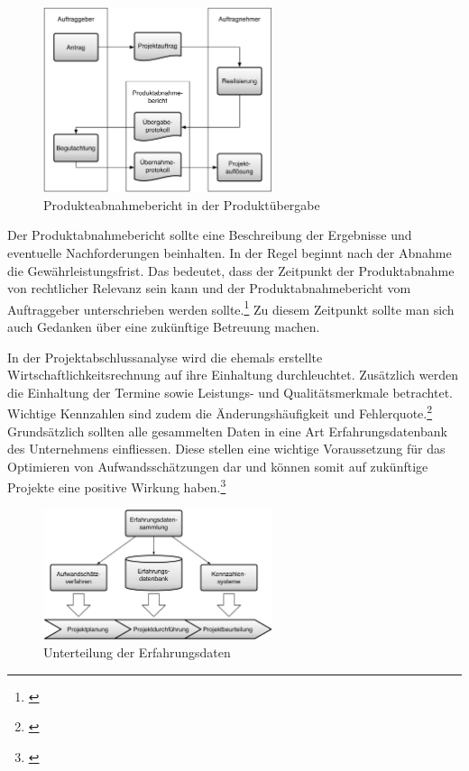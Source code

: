 \begin{figure}[htbp]
\begin{center}
\includegraphics[width=0.6\textwidth,angle=0]{./bilder/theorie/07_produkteuebergabe.pdf}
\caption{Produkteabnahmebericht in der Produktübergabe}
\label{pic:07_produkteuebergabe}
\end{center}
\end{figure}

Der Produktabnahmebericht sollte eine Beschreibung der Ergebnisse und eventuelle
Nachforderungen beinhalten. In der Regel beginnt nach der Abnahme die
Gewährleistungsfrist. Das bedeutet, dass der Zeitpunkt der Produktabnahme von
rechtlicher Relevanz sein kann und der Produktabnahmebericht vom Auftraggeber
unterschrieben werden sollte.\footnote{\citealp*[Vgl.][S. 86]{cronenbroeck2004handbuch}}
Zu diesem Zeitpunkt sollte man sich auch Gedanken über eine zukünftige Betreuung
machen.

In der Projektabschlussanalyse wird die ehemals erstellte Wirtschaftlichkeitsrechnung
auf ihre Einhaltung durchleuchtet. Zusätzlich werden die Einhaltung der Termine sowie
Leistungs- und Qualitätsmerkmale betrachtet. Wichtige Kennzahlen sind zudem
die Änderungshäufigkeit und Fehlerquote.\footnote{\citealp*[Vgl.][S. 265]{schelle2007projekte}}
Grundsätzlich sollten alle gesammelten Daten in eine Art Erfahrungsdatenbank 
des Unternehmens einfliessen. Diese stellen eine wichtige Voraussetzung für das 
Optimieren von Aufwandsschätzungen dar und können somit auf zukünftige Projekte 
eine positive Wirkung haben.\footnote{\citealp*[Vgl.][S. 275]{burghardt2007einfuehrung}}

\begin{figure}[htbp]
\begin{center}
\includegraphics[width=0.6\textwidth,angle=0]{./bilder/theorie/04_unterteilung_erfahrungsdaten.pdf}
\caption{Unterteilung der Erfahrungsdaten}
\label{pic:04_unterteilung_erfahrungsdaten}
\end{center}
\end{figure}

